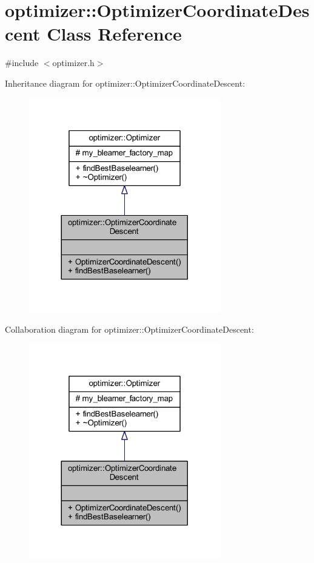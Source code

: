 \hypertarget{classoptimizer_1_1_optimizer_coordinate_descent}{}\section{optimizer\+:\+:Optimizer\+Coordinate\+Descent Class Reference}
\label{classoptimizer_1_1_optimizer_coordinate_descent}


{\ttfamily \#include $<$optimizer.\+h$>$}



Inheritance diagram for optimizer\+:\+:Optimizer\+Coordinate\+Descent\+:\nopagebreak
\begin{figure}[H]
\begin{center}
\leavevmode
\includegraphics[width=236pt]{classoptimizer_1_1_optimizer_coordinate_descent__inherit__graph}
\end{center}
\end{figure}


Collaboration diagram for optimizer\+:\+:Optimizer\+Coordinate\+Descent\+:\nopagebreak
\begin{figure}[H]
\begin{center}
\leavevmode
\includegraphics[width=236pt]{classoptimizer_1_1_optimizer_coordinate_descent__coll__graph}
\end{center}
\end{figure}
